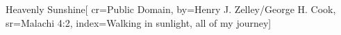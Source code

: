 {Heavenly Sunshine}[
    cr={Public Domain},
    by={Henry J. Zelley/George H. Cook},
    sr={Malachi 4:2},
    index={Walking in sunlight, all of my journey}]
